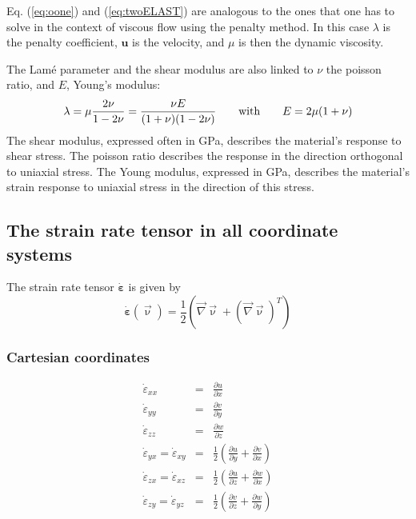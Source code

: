 

\begin{remark}
Eq. (\ref{eq:oone}) and (\ref{eq:twoELAST}) are analogous to the ones that one has to solve
in the context of viscous flow using the penalty method. In this case $\lambda$ is the penalty coefficient, 
${\bm u}$ is the velocity, and $\mu$ is then the dynamic viscosity.
\end{remark}

The Lam\'e parameter and the shear modulus are also linked to $\nu$ the poisson ratio, 
and $E$, Young's modulus:  
\[
\lambda=\mu\frac{2\nu}{1-2\nu}
=\frac{\nu E}{(1+\nu)(1-2\nu)}
\quad\quad
{\rm with}
\quad\quad
E=2\mu(1+\nu)
\]
The shear modulus, expressed often in GPa, describes the material's response to shear stress.
The poisson ratio describes the response in the direction orthogonal to uniaxial stress.
The Young modulus, expressed in GPa, describes the material's strain response to uniaxial stress in the 
direction of this stress.


\newpage
\subsection{The strain rate tensor in all coordinate systems}

The strain rate tensor $\dot{\bm\varepsilon}$ is given by
\begin{equation}
\dot{\bm \varepsilon}({\vec \upnu}) = \frac{1}{2}( {\vec \nabla}{\vec \upnu}+ ({\vec \nabla}{\vec \upnu})^T) 
\end{equation}

\subsubsection{Cartesian coordinates}
\begin{eqnarray}
\dot\varepsilon_{xx} &=& \frac{\partial u}{\partial x} \\
\dot\varepsilon_{yy} &=& \frac{\partial v}{\partial y} \\
\dot\varepsilon_{zz} &=& \frac{\partial w}{\partial z} \\
\dot\varepsilon_{yx} =
\dot\varepsilon_{xy} &=& \frac{1}{2} \left( \frac{\partial u}{\partial y} + \frac{\partial v}{\partial x}  \right)\\
\dot\varepsilon_{zx} =
\dot\varepsilon_{xz} &=& \frac{1}{2} \left( \frac{\partial u}{\partial z} + \frac{\partial w}{\partial x}  \right)\\
\dot\varepsilon_{zy} =
\dot\varepsilon_{yz} &=& \frac{1}{2} \left( \frac{\partial v}{\partial z} + \frac{\partial w}{\partial y}  \right)
\end{eqnarray}

